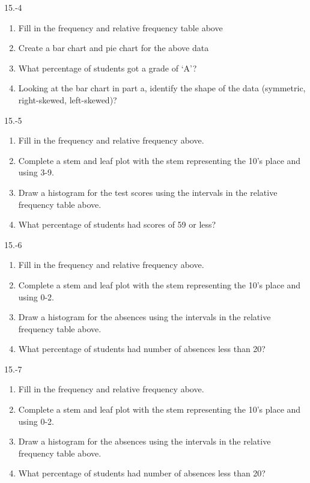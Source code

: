 \begin{exsol@solution}{15.-4}
  \begin{enumerate}
  \item Fill in the frequency and relative frequency table above
  \item  Create a bar chart and pie chart for the above data
  \item  What percentage of students got a grade of `A'?
  \item  Looking at the bar chart in part a, identify the shape of the data (symmetric, right-skewed, left-skewed)?
\end{enumerate}
\end{exsol@solution}
\begin{exsol@solution}{15.-5}
  \begin{enumerate}
  \item Fill in the frequency and relative frequency above.
  \item	Complete a stem and leaf plot with the stem representing the 10’s place and using 3-9.
  \item Draw a histogram for the test scores using the intervals in the relative frequency table above.
  \item	What percentage of students had scores of 59 or less?
\end{enumerate}

\end{exsol@solution}
\begin{exsol@solution}{15.-6}
\begin{enumerate}
  \item	Fill in the frequency and relative frequency above.
  \item	Complete a stem and leaf plot with the stem representing the 10's place and using 0-2.
  \item	Draw a histogram for the absences using the intervals in the relative frequency table above.
  \item	What percentage of students had number of absences less than 20?
\end{enumerate}

\end{exsol@solution}
\begin{exsol@solution}{15.-7}
\begin{enumerate}
  \item	Fill in the frequency and relative frequency above.
  \item	Complete a stem and leaf plot with the stem representing the 10's place and using 0-2.
  \item	Draw a histogram for the absences using the intervals in the relative frequency table above.
  \item	What percentage of students had number of absences less than 20?
\end{enumerate}

\end{exsol@solution}
